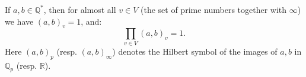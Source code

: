 If $a, b \in \mathbb{Q}^*$, then for almost all $v \in V$ (the set of prime numbers together with $\infty$) we have $(a, b)_v = 1$, and:
$$\prod_{v \in V} (a, b)_v = 1.$$
Here $(a, b)_p$ (resp. $(a, b)_\infty$) denotes the Hilbert symbol of the images of $a, b$ in $\mathbb{Q}_p$ (resp. $\mathbb{R}$).
